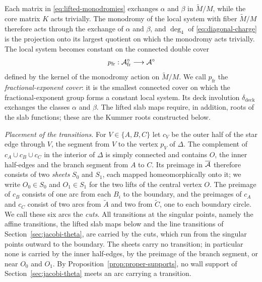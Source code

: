 Each matrix in \eqref{eq:lifted-monodromies} exchanges $\alpha$ and $\beta$
in $\widetilde M/M$, while the core matrix $K$ acts trivially.  The
monodromy of the local system with fiber $\widetilde M/M$ therefore acts
through the exchange of $\alpha$ and $\beta$, and $\deg_4$ of
\eqref{eq:diagonal-charge} is the projection onto its largest quotient on
which the monodromy acts trivially.  The local system becomes constant on
the connected double cover
\[
 p_{\mathrm{fr}}:\mathcal A^\circ_{\mathrm{fr}}\longrightarrow\mathcal A^\circ
\]
defined by the kernel of the monodromy action on $\widetilde M/M$.  We call
$p_{\mathrm{fr}}$ the \emph{fractional-exponent cover}: it is the smallest
connected cover on which the fractional-exponent group forms a constant
local system.  Its deck involution $\delta_{\mathrm{deck}}$ exchanges the
classes $\alpha$ and $\beta$.  The lifted slab maps require, in addition,
roots of the slab functions; these are the Kummer roots constructed below.

\emph{Placement of the transitions.}  For $V\in\{A,B,C\}$ let $c_V$ be the
outer half of the star edge through $V$, the segment from $V$ to the vertex
$p_V$ of $\Delta$.  The complement of $c_A\cup c_B\cup c_C$ in the interior
of $\Delta$ is simply connected and contains $O$, the inner half-edges and
the branch segment from $A$ to $C$.  Its preimage in $\overline{\mathcal A}$
therefore consists of two \emph{sheets} $S_0$ and $S_1$, each mapped
homeomorphically onto it; we write $O_0\in S_0$ and $O_1\in S_1$ for the two
lifts of the central vertex $O$.  The preimage of $c_B$ consists of one arc
from each $B_i$ to the boundary, and the preimages of $c_A$ and $c_C$
consist of two arcs from $\widetilde A$ and two from $\widetilde C$, one to
each boundary circle.  We call these six arcs the \emph{cuts}.  All
transitions at the singular points, namely the affine transitions, the
lifted slab maps below and the line transitions of
Section~\ref{sec:jacobi-theta}, are carried by the cuts, which run from the
singular points outward to the boundary.  The sheets carry no transition;
in particular none is carried by the inner half-edges, by the preimage of
the branch segment, or near $O_0$ and $O_1$.  By
Proposition~\ref{prop:proper-supports}, no wall support of
Section~\ref{sec:jacobi-theta} meets an arc carrying a transition.

